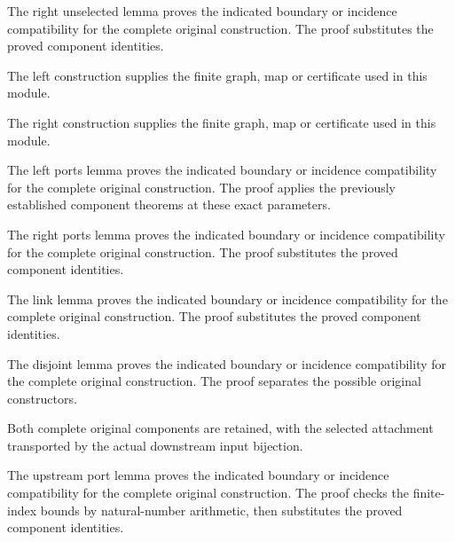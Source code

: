 The right unselected lemma proves the indicated boundary or incidence compatibility for the complete original construction.
The proof substitutes the proved component identities.
\par{}

The left construction supplies the finite graph, map or certificate used in this module.
\par{}

The right construction supplies the finite graph, map or certificate used in this module.
\par{}

The left ports lemma proves the indicated boundary or incidence compatibility for the complete original construction.
The proof applies the previously established component theorems at these exact parameters.
\par{}

The right ports lemma proves the indicated boundary or incidence compatibility for the complete original construction.
The proof substitutes the proved component identities.
\par{}

The link lemma proves the indicated boundary or incidence compatibility for the complete original construction.
The proof substitutes the proved component identities.
\par{}

The disjoint lemma proves the indicated boundary or incidence compatibility for the complete original construction.
The proof separates the possible original constructors.
\par{}

Both complete original components are retained, with the selected
attachment transported by the actual downstream input bijection.
\par{}

The upstream port lemma proves the indicated boundary or incidence compatibility for the complete original construction.
The proof checks the finite-index bounds by natural-number arithmetic, then substitutes the proved component identities.
\par{}

